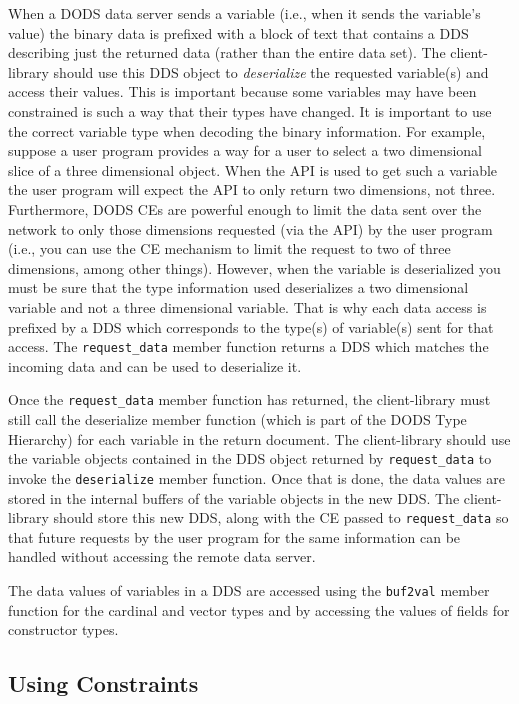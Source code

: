 When a DODS data server sends a variable (i.e., when it sends the variable's
value) the binary data is prefixed with a block of text that contains a DDS
describing just the returned data (rather than the entire data set). The
client-library should use this DDS object to {\em deserialize\/} the requested
variable(s) and access their values. This is important because some variables
may have been constrained is such a way that their types have changed. It is
important to use the correct variable type when decoding the binary
information. For example, suppose a user program provides a way for a user to
select a two dimensional slice of a three dimensional object. When the API is
used to get such a variable the user program will expect the API to only
return two dimensions, not three. Furthermore, DODS CEs are powerful enough
to limit the data sent over the network to only those dimensions requested
(via the API) by the user program (i.e., you can use the CE mechanism to
limit the request to two of three dimensions, among other things). However,
when the variable is deserialized you must be sure that the type information
used deserializes a two dimensional variable and not a three dimensional
variable. That is why each data access is prefixed by a DDS which corresponds
to the type(s) of variable(s) sent for that access. The {\tt request\_data}
member function returns a DDS which matches the incoming data and can be used
to deserialize it.

Once the {\tt request\_data} member function has returned, the
client-library must still call the deserialize member function (which is part
of the DODS Type Hierarchy) for each variable in the return document. The
client-library should use the variable objects contained in the DDS object
returned by {\tt request\_data} to invoke the {\tt deserialize} member
function. Once that is done, the data values are stored in the internal
buffers of the variable objects in the new DDS. The client-library should
store this new DDS, along with the CE passed to {\tt request\_data} so that
future requests by the user program for the same information can be handled
without accessing the remote data server.

The data values of variables in a DDS are accessed using the {\tt buf2val}
member function for the cardinal and vector types and by accessing the values
of fields for constructor types.

\subsection{Using Constraints}
\label{tk:constraints}

